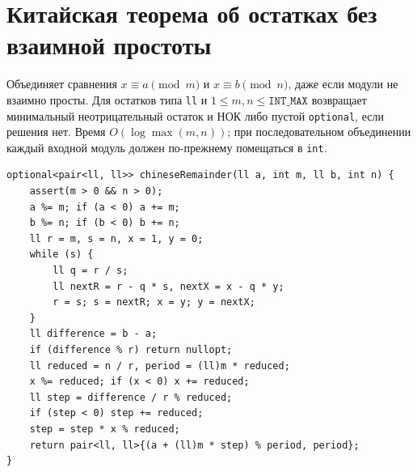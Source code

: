 \section{Китайская теорема об остатках без взаимной простоты}
Объединяет сравнения $x\equiv a\pmod m$ и $x\equiv b\pmod n$, даже если модули не взаимно просты.
Для остатков типа \texttt{ll} и $1\le m,n\le\texttt{INT\_MAX}$ возвращает минимальный неотрицательный остаток и НОК либо пустой \texttt{optional}, если решения нет.
Время $O(\log\max(m,n))$; при последовательном объединении каждый входной модуль должен по-прежнему помещаться в \texttt{int}.
\begin{lstlisting}[name=extra_math_crt]
optional<pair<ll, ll>> chineseRemainder(ll a, int m, ll b, int n) {
    assert(m > 0 && n > 0);
    a %= m; if (a < 0) a += m;
    b %= n; if (b < 0) b += n;
    ll r = m, s = n, x = 1, y = 0;
    while (s) {
        ll q = r / s;
        ll nextR = r - q * s, nextX = x - q * y;
        r = s; s = nextR; x = y; y = nextX;
    }
    ll difference = b - a;
    if (difference % r) return nullopt;
    ll reduced = n / r, period = (ll)m * reduced;
    x %= reduced; if (x < 0) x += reduced;
    ll step = difference / r % reduced;
    if (step < 0) step += reduced;
    step = step * x % reduced;
    return pair<ll, ll>{(a + (ll)m * step) % period, period};
}
\end{lstlisting}
%

